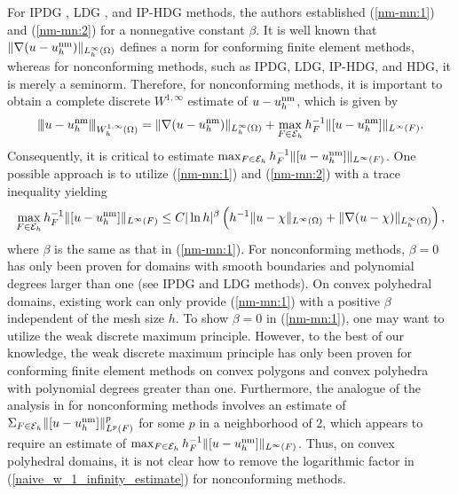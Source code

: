 \documentclass[1996/10/24]{amsart}
\theoremstyle{definition}
\numberwithin{equation}{section}
\newcommand{\vertiii}[1]{{\left\vert\kern-0.25ex\left\vert\kern-0.25ex\left\vert #1
    \right\vert\kern-0.25ex\right\vert\kern-0.25ex\right\vert}}
\begin{document}
For IPDG \cite{cc2005}, LDG \cite{c2005, g2006}, and IP-HDG \cite{lc2026} methods, the authors established (\ref{nm-mn:1}) and (\ref{nm-mn:2}) for a nonnegative constant $\beta$.
It is well known that $\|\nabla(u-u_h^{{\rm nm}})\|_{L_h^{\infty}(\Omega)}$ defines a norm for conforming finite element
methods, whereas for nonconforming methods, such as IPDG, LDG, IP-HDG, and HDG, it is merely a seminorm.
Therefore, for nonconforming methods, it is important to
obtain a complete discrete $W^{1,\infty}$ estimate of $u - u_{h}^{{\rm nm}}$, which is given by
\begin{align}
\label{discrete_w_1_infinity}
\vertiii{u-u_h^{{\rm nm}}}_{W_{h}^{1,\infty}(\Omega)}
= \|\nabla (u-u_h^{{\rm nm}} ) \|_{L_h^{\infty}(\Omega)}
+ \max_{F \in \mathcal{E}_{h}}h_{F}^{-1} \Vert [u-u_h^{{\rm nm}}] \Vert_{L^{\infty}(F)}.
\end{align}
Consequently, it is critical to estimate $\max_{F \in \mathcal{E}_{h}}h_{F}^{-1} \Vert [u-u_h^{{\rm nm}}] \Vert_{L^{\infty}(F)}$.
One possible approach is to utilize (\ref{nm-mn:1}) and  (\ref{nm-mn:2}) with a trace inequality yielding
\begin{align}
\label{naive_w_1_infinity_estimate}
\max_{F \in \mathcal{E}_{h}}h_{F}^{-1} \Vert [u-u_h^{{\rm nm}}] \Vert_{L^{\infty}(F)}
\leq C |\ln h|^{\beta} \left( h^{-1}\|u-\chi\|_{L^{\infty}(\Omega)}+\|\nabla(u-\chi)\|_{L_h^{\infty}(\Omega)}\right),
\end{align}
where $\beta$ is the same as that in (\ref{nm-mn:1}). For nonconforming methods, $\beta = 0$ has only been proven for
domains with smooth boundaries and polynomial degrees larger than one (see IPDG \cite{cc2005} and LDG
\cite{c2005,g2006} methods). On convex polyhedral domains, existing work \cite{lc2026} can only provide (\ref{nm-mn:1})
with a positive $\beta$ independent of the mesh size $h$. To show $\beta = 0$ in (\ref{nm-mn:1}), one may want to utilize the
weak discrete maximum principle. However, to the best of our knowledge, the weak discrete maximum principle has only been proven for conforming finite
element methods on convex polygons \cite{s1980} and convex polyhedra \cite{ll2020} with polynomial degrees
greater than one. Furthermore, the analogue of the analysis in \cite{ll2020} for nonconforming methods involves
an estimate of $\Sigma_{F\in \mathcal{E}_{h}}\Vert [u - u_{h}^{{\rm nm}}]\Vert_{L^{p}(F)}^{p}$ for some $p$ in a neighborhood of $2$, which
appears to require an estimate of $\max_{F \in \mathcal{E}_{h}}h_{F}^{-1} \Vert [u-u_h^{{\rm nm}}] \Vert_{L^{\infty}(F)}$.
Thus, on convex polyhedral domains,  it is not clear how to remove the logarithmic factor
in (\ref{naive_w_1_infinity_estimate}) for nonconforming methods.
\end{document}
